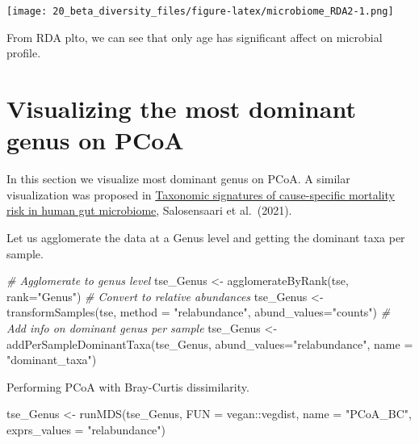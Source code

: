 \documentclass[
]{book}
\newenvironment{Shaded}{\begin{snugshade}}{\end{snugshade}}
\newcommand{\AttributeTok}[1]{\textcolor[rgb]{0.77,0.63,0.00}{#1}}
\newcommand{\CommentTok}[1]{\textcolor[rgb]{0.56,0.35,0.01}{\textit{#1}}}
\newcommand{\FunctionTok}[1]{\textcolor[rgb]{0.00,0.00,0.00}{#1}}
\newcommand{\NormalTok}[1]{#1}
\newcommand{\OtherTok}[1]{\textcolor[rgb]{0.56,0.35,0.01}{#1}}
\newcommand{\SpecialCharTok}[1]{\textcolor[rgb]{0.00,0.00,0.00}{#1}}
\newcommand{\StringTok}[1]{\textcolor[rgb]{0.31,0.60,0.02}{#1}}
\begin{document}
\texttt{[image: 20\_beta\_diversity\_files/figure-latex/microbiome\_RDA2-1.png]}

From RDA plto, we can see that only age has significant affect on microbial profile.

\hypertarget{visualizing-the-most-dominant-genus-on-pcoa}{%
\section{Visualizing the most dominant genus on PCoA}\label{visualizing-the-most-dominant-genus-on-pcoa}}

In this section we visualize most dominant genus on PCoA. A similar visualization was proposed in \href{https://www.nature.com/articles/s41467-021-22962-y}{Taxonomic signatures of cause-specific mortality risk in human gut microbiome}, Salosensaari et al.~(2021).

Let us agglomerate the data at a Genus level and getting the dominant taxa per sample.

\begin{Shaded}
\begin{Highlighting}[]
\CommentTok{\# Agglomerate to genus level}
\NormalTok{tse\_Genus }\OtherTok{\textless{}{-}} \FunctionTok{agglomerateByRank}\NormalTok{(tse, }\AttributeTok{rank=}\StringTok{"Genus"}\NormalTok{)}
\CommentTok{\# Convert to relative abundances}
\NormalTok{tse\_Genus }\OtherTok{\textless{}{-}} \FunctionTok{transformSamples}\NormalTok{(tse, }\AttributeTok{method =} \StringTok{"relabundance"}\NormalTok{, }\AttributeTok{abund\_values=}\StringTok{"counts"}\NormalTok{)}
\CommentTok{\# Add info on dominant genus per sample}
\NormalTok{tse\_Genus }\OtherTok{\textless{}{-}} \FunctionTok{addPerSampleDominantTaxa}\NormalTok{(tse\_Genus, }\AttributeTok{abund\_values=}\StringTok{"relabundance"}\NormalTok{, }\AttributeTok{name =} \StringTok{"dominant\_taxa"}\NormalTok{)}
\end{Highlighting}
\end{Shaded}

Performing PCoA with Bray-Curtis dissimilarity.

\begin{Shaded}
\begin{Highlighting}[]
\NormalTok{tse\_Genus }\OtherTok{\textless{}{-}} \FunctionTok{runMDS}\NormalTok{(tse\_Genus, }\AttributeTok{FUN =}\NormalTok{ vegan}\SpecialCharTok{::}\NormalTok{vegdist,}
              \AttributeTok{name =} \StringTok{"PCoA\_BC"}\NormalTok{, }\AttributeTok{exprs\_values =} \StringTok{"relabundance"}\NormalTok{)}
\end{Highlighting}
\end{Shaded}
\end{document}
